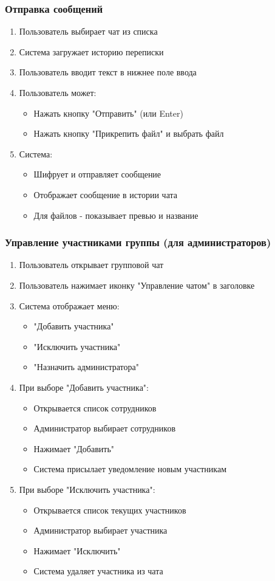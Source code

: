 \subsubsection{Отправка сообщений}
\begin{enumerate}
	\item Пользователь выбирает чат из списка
	\item Система загружает историю переписки
	\item Пользователь вводит текст в нижнее поле ввода
	\item Пользователь может:
	\begin{itemize}
		\item Нажать кнопку "Отправить" (или Enter)
		\item Нажать кнопку "Прикрепить файл" и выбрать файл
	\end{itemize}
	\item Система:
	\begin{itemize}
		\item Шифрует и отправляет сообщение
		\item Отображает сообщение в истории чата
		\item Для файлов - показывает превью и название
	\end{itemize}
\end{enumerate}

\subsubsection{Управление участниками группы (для администраторов)}
\begin{enumerate}
	\item Пользователь открывает групповой чат
	\item Пользователь нажимает иконку "Управление чатом" в заголовке
	\item Система отображает меню:
	\begin{itemize}
		\item "Добавить участника"
		\item "Исключить участника"
		\item "Назначить администратора"
	\end{itemize}
	\item При выборе "Добавить участника":
	\begin{itemize}
		\item Открывается список сотрудников
		\item Администратор выбирает сотрудников
		\item Нажимает "Добавить"
		\item Система присылает уведомление новым участникам
	\end{itemize}
	\item При выборе "Исключить участника":
	\begin{itemize}
		\item Открывается список текущих участников
		\item Администратор выбирает участника
		\item Нажимает "Исключить"
		\item Система удаляет участника из чата
	\end{itemize}
\end{enumerate}

